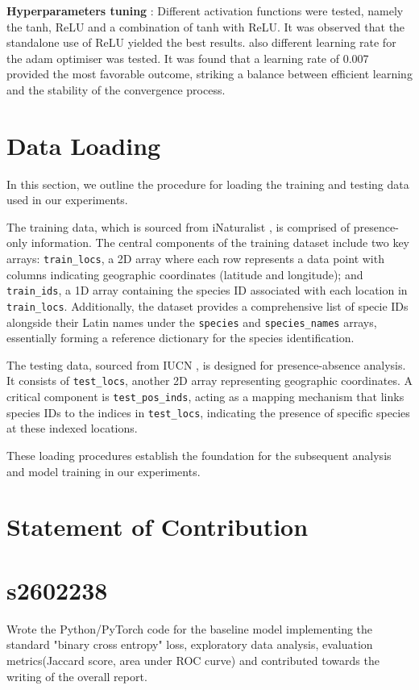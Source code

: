 \documentclass{article}
\begin{document}
\textbf{Hyperparameters tuning} : 
Different activation functions were tested, namely the tanh, ReLU and a combination of tanh with ReLU. It was observed that the standalone use of ReLU yielded the best results.
also different learning rate for the adam optimiser was tested. It was found that a learning rate of 0.007 provided the most favorable outcome, striking a balance between efficient learning and the stability of the convergence process.

\section{Data Loading}
In this section, we outline the procedure for loading the training and testing data used in our experiments.

The training data, which is sourced from iNaturalist \cite{iNaturalist}, is comprised of presence-only information. The central components of the training dataset include two key arrays: \texttt{train\_locs}, a 2D array where each row represents a data point with columns indicating geographic coordinates (latitude and longitude); and \texttt{train\_ids}, a 1D array containing the species ID associated with each location in \texttt{train\_locs}. Additionally, the dataset provides a comprehensive list of specie IDs alongside their Latin names under the \texttt{species} and \texttt{species\_names} arrays, essentially forming a reference dictionary for the species identification.

The testing data, sourced from IUCN \cite{iucn}, is designed for presence-absence analysis. It consists of \texttt{test\_locs}, another 2D array representing geographic coordinates. A critical component is \texttt{test\_pos\_inds}, acting as a mapping mechanism that links species IDs to the indices in \texttt{test\_locs}, indicating the presence of specific species at these indexed locations.

These loading procedures establish the foundation for the subsequent analysis and model training in our experiments.

\section*{\Large Statement of Contribution}
\section*{s2602238}
Wrote the Python/PyTorch code for the baseline model implementing the standard "binary cross entropy" loss,  exploratory data analysis, evaluation metrics(Jaccard score, area under ROC curve) and contributed towards the writing of the overall report.
\end{document}
